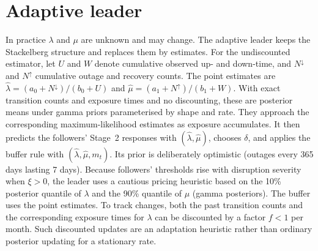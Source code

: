 \documentclass{ifacconf}
\newcommand{\rev}[1]{#1}
\newcommand{\dl}{\delta}
\begin{document}
\section{Adaptive leader}
In practice $\lambda$ and $\mu$ are unknown and may change. The adaptive leader keeps the Stackelberg structure and replaces them by estimates. \rev{For the undiscounted estimator, let $U$ and $W$ denote cumulative observed up- and down-time, and $N^{\downarrow}$ and $N^{\uparrow}$ cumulative outage and recovery counts. The point estimates are} $\hat\lambda=(a_0+N^{\downarrow})/(b_0+U)$ and $\hat\mu=(a_1+N^{\uparrow})/(b_1+W)$. \rev{With exact transition counts and exposure times and no discounting, these are posterior means under gamma priors parameterised by shape and rate. They approach the corresponding maximum-likelihood estimates as exposure accumulates.} It then predicts the followers' Stage~2 responses with $(\hat\lambda,\hat\mu)$, chooses $\dl$, and applies the buffer rule with $(\hat\lambda,\hat\mu,m_t)$. Its prior is deliberately optimistic (outages every 365 days lasting 7 days). Because followers' thresholds rise with disruption severity when $\xi>0$, \rev{the leader uses a cautious pricing heuristic based on} the 10\% posterior quantile of $\lambda$ and the 90\% quantile of $\mu$ (gamma posteriors). The buffer uses the point estimates. \rev{To track changes, both the past transition counts and the corresponding exposure times for $\lambda$ can be discounted by a factor $f<1$ per month. Such discounted updates are an adaptation heuristic rather than ordinary posterior updating for a stationary rate.}

\end{document}
